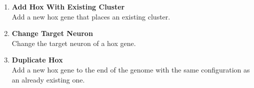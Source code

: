 \begin{enumerate}
	\item \textbf{Add Hox With Existing Cluster} \\	
	Add a new hox gene that places an existing cluster.
	
	\item \textbf{Change Target Neuron} \\	
	Change the target neuron of a hox gene.
	
	\item \textbf{Duplicate Hox} \\	
	Add a new hox gene to the end of the genome with the same configuration as an already existing one.
	
\end{enumerate}
